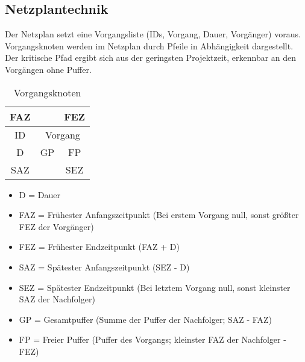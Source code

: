 \subsection{Netzplantechnik}

Der Netzplan setzt eine Vorgangsliste (IDs, Vorgang, Dauer, Vorgänger) voraus. Vorgangsknoten werden im Netzplan durch Pfeile in Abhängigkeit dargestellt. Der kritische Pfad ergibt sich aus der geringsten Projektzeit, erkennbar an den Vorgängen ohne Puffer.

\begin{table}
    [H]
    \centering
    \begin{tabular}{|c|c|c|}
        \multicolumn{1}{c}{FAZ} & \multicolumn{1}{c}{}         & \multicolumn{1}{c}{FEZ} \\\hline
        ID                      & \multicolumn{2}{c|}{Vorgang}                           \\\hline
        D                       & GP                           & FP                      \\\hline
        \multicolumn{1}{c}{SAZ} & \multicolumn{1}{c}{}         & \multicolumn{1}{c}{SEZ} \\
    \end{tabular}
    \caption{Vorgangsknoten}
\end{table}

\begin{itemize}
    \item D = Dauer
    \item FAZ = Frühester Anfangszeitpunkt (Bei erstem Vorgang null, sonst größter FEZ der Vorgänger)
    \item FEZ = Frühester Endzeitpunkt (FAZ + D)
    \item SAZ = Spätester Anfangszeitpunkt (SEZ - D)
    \item SEZ = Spätester Endzeitpunkt (Bei letztem Vorgang null, sonst kleinster SAZ der Nachfolger)
    \item GP = Gesamtpuffer (Summe der Puffer der Nachfolger; SAZ - FAZ)
    \item FP = Freier Puffer (Puffer des Vorgangs; kleinster FAZ der Nachfolger - FEZ)
\end{itemize}